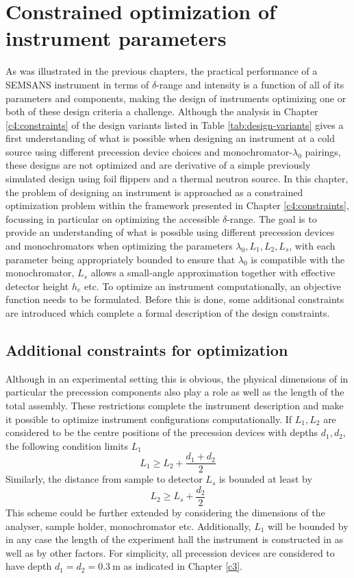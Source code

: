 \chapter{Constrained optimization of instrument parameters}
\label{chapter:optimization}
\label{c5:optimization}
As was illustrated in the previous chapters, the practical performance of a SEMSANS instrument in terms of $\delta$-range and intensity is a function of all of its parameters and components, making the design of instruments optimizing one or both of these design criteria a challenge. Although the analysis in Chapter \ref{c4:constraints} of the design variants listed in Table \ref{tab:design-variants} gives a first understanding of what is possible when designing an instrument at a cold source using different precession device choices and monochromator-$\lambda_0$ pairings, these designs are not optimized and are derivative of a simple previously simulated design \cite{bouwman2021b} using foil flippers and a thermal neutron source. In this chapter, the problem of designing an instrument is approached as a constrained optimization problem within the framework presented in Chapter \ref{c4:constraints}, focussing in particular on optimizing the accessible $\delta$-range. The goal is to provide an understanding of what is possible using different precession devices and monochromators when optimizing the parameters $\lambda_0, L_1, L_2, L_s$, with each parameter being appropriately bounded to ensure that $\lambda_0$ is compatible with the monochromator, $L_s$ allows a small-angle approximation together with effective detector height $h_e$ etc. 
To optimize an instrument computationally, an objective function needs to be formulated. Before this is done, some additional constraints are introduced which complete a formal description of the design constraints.

\section{Additional constraints for optimization}
\label{c5.1}
Although in an experimental setting this is obvious, the physical dimensions of in particular the precession components also play a role as well as the length of the total assembly. These restrictions complete the instrument description and make it possible to optimize instrument configurations computationally. If $L_1, L_2$ are considered to be the centre positions of the precession devices with depths $d_1, d_2$, the following condition limits $L_1$
$$L_1 \geq L_2 + \frac{d_1 + d_2}{2}$$
Similarly, the distance from sample to detector $L_s$ is bounded at least by
$$L_2 \geq L_s + \frac{d_2}{2}$$
This scheme could be further extended by considering the dimensions of the analyser, sample holder, monochromator etc. Additionally, $L_1$  will be bounded by in any case the length of the experiment hall the instrument is constructed in as well as by other factors. For simplicity, all precession devices are considered to have depth $d_1 = d_2 = \SI{0.3}{\meter}$ as indicated in Chapter \ref{c3}. 

